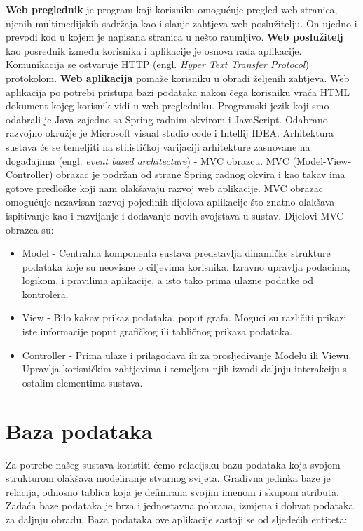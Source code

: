 \textbf{Web preglednik} je program koji korisniku omogućuje pregled web-stranica, njenih multimedijskih sadržaja kao i slanje zahtjeva web poslužitelju. On ujedno i prevodi kod u kojem je napisana stranica u nešto raumljivo.
\newline
\indent\textbf{Web poslužitelj} kao posrednik između korisnika i aplikacije je osnova rada aplikacije. Komunikacija se ostvaruje HTTP  (engl. \textit{Hyper Text Transfer Protocol}) protokolom.
\newline
\indent\textbf{Web aplikacija} pomaže korisniku u obradi željenih zahtjeva. Web aplikacija po potrebi pristupa bazi podataka nakon čega korisniku vraća HTML dokument kojeg korisnik vidi u web pregledniku.
Programski jezik koji smo odabrali je Java zajedno sa Spring radnim okvirom i JavaScript. Odabrano razvojno okružje je Microsoft visual studio code i Intellij IDEA. Arhitektura sustava će se temeljiti na stilističkoj varijaciji arhitekture zasnovane na događajima (engl. \textit{event based architecture}) - MVC obrazcu.
\indent MVC (Model-View-Controller) obrazac je podržan od strane Spring radnog okvira i kao takav ima gotove predloške koji nam olakšavaju razvoj web aplikacije.
\newline
MVC obrazac omogućuje nezavisan razvoj pojedinih dijelova aplikacije što znatno olakšava ispitivanje kao i razvijanje i dodavanje novih svojstava u sustav.
\newline
Dijelovi MVC obrazca su:
\begin{itemize}
	\item Model - Centralna komponenta sustava predstavlja dinamičke strukture podataka koje su neovisne o ciljevima korisnika. Izravno upravlja podacima, logikom, i pravilima aplikacije, a isto tako prima ulazne podatke od kontrolera.
	\item View - Bilo kakav prikaz podataka, poput grafa. Moguci su različiti prikazi iste informacije poput grafičkog ili tabličnog prikaza podataka. 
	\item Controller - Prima ulaze i prilagođava ih za prosljeđivanje Modelu ili Viewu.
	Upravlja korisničkim zahtjevima i temeljem njih izvodi daljnju interakciju s ostalim elementima sustava.
\end{itemize}

				
		\section{Baza podataka}
			
		Za potrebe našeg sustava koristiti ćemo relacijsku bazu podataka koja svojom strukturom olakšava modeliranje stvarnog svijeta. Gradivna jedinka baze je relacija, odnosno tablica koja je definirana svojim imenom i skupom atributa. Zadaća baze podataka je brza i jednostavna pohrana, izmjena i dohvat podataka za daljnju obradu.
		Baza podataka ove aplikacije sastoji se od sljedećih entiteta: 
		
